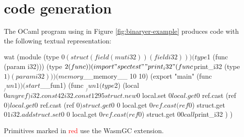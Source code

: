 \chapter{\wasm{} code generation}
\label{extra:codegen}

The OCaml program using \binaryendsl{} in Figure \ref{fig:binaryer-example} produces \wasm{} code with the following textual representation:
\begin{center}
\begin{cminted}{wat}
(module
 (type $0 (struct (field (mut i32)) (field i32)))
 (type $1 (func (param i32)))
 (type $2 (func))
 (import "spectest" "print_i32" 
   (func $print_i32 (type $1) (param i32)))
 (memory $__memory__ 10 10)
 (export "main" (func $__fun1))
 (start $__fun1)
 (func $__fun1 (type $2)
  (local $0 anyref)
  i32.const 42
  i32.const 1295
  struct.new $0
  local.set $0
  local.get $0
  ref.cast (ref $0)
  local.get $0
  ref.cast (ref $0)
  struct.get $0 0
  local.get $0
  ref.cast (ref $0)
  struct.get $0 1
  i32.add
  struct.set $0 0
  local.get $0
  ref.cast (ref $0)
  struct.get $0 0
  call $print_i32
 )
)
\end{cminted}
\end{center}
Primitives marked in \textcolor{red}{red} use the WasmGC extension.